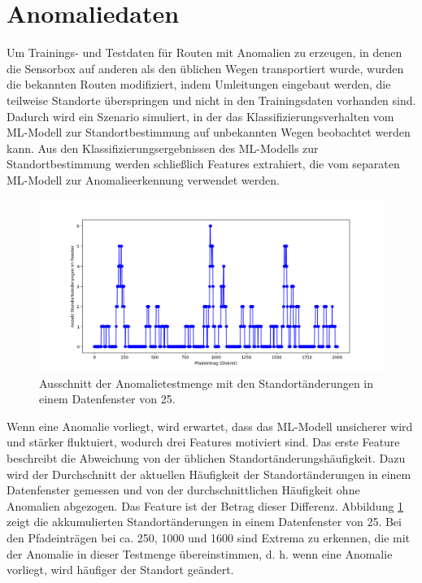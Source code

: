 \section{Anomaliedaten}
\label{sec:data_anomalie}
Um Trainings- und Testdaten für Routen mit Anomalien zu erzeugen, in denen die Sensorbox auf anderen als den üblichen Wegen transportiert wurde,
wurden die bekannten Routen modifiziert, indem Umleitungen eingebaut werden, die teilweise Standorte überspringen und nicht in den Trainingsdaten vorhanden sind.
Dadurch wird ein Szenario simuliert, in der das Klassifizierungsverhalten vom ML-Modell zur Standortbestimmung auf unbekannten Wegen beobachtet werden kann.
Aus den Klassifizierungsergebnissen des ML-Modells zur Standortbestimmung werden schließlich Features extrahiert,
die vom separaten ML-Modell zur Anomalieerkennung verwendet werden.
\begin{figure}[h!]
    \centering
    \includegraphics[width=\linewidth]{images/feature_window_location_changes.png}
    \caption{Ausschnitt der Anomalietestmenge mit den Standortänderungen in einem Datenfenster von 25.}
    \label{fig:window_location_changes}
\end{figure}
\newpage
Wenn eine Anomalie vorliegt, wird erwartet, dass das ML-Modell unsicherer wird und stärker fluktuiert,
wodurch drei Features motiviert sind.
Das erste Feature beschreibt die Abweichung von der üblichen Standortänderungshäufigkeit.
Dazu wird der Durchschnitt der aktuellen Häufigkeit der Standortänderungen in einem Datenfenster gemessen und von der durchschnittlichen Häufigkeit ohne Anomalien abgezogen.
Das Feature ist der Betrag dieser Differenz.
Abbildung \ref{fig:window_location_changes} zeigt die akkumulierten Standortänderungen in einem Datenfenster von 25.
Bei den Pfadeinträgen bei ca. 250, 1000 und 1600 sind Extrema zu erkennen, die mit der Anomalie in dieser Testmenge übereinstimmen,
d. h. wenn eine Anomalie vorliegt, wird häufiger der Standort geändert.

